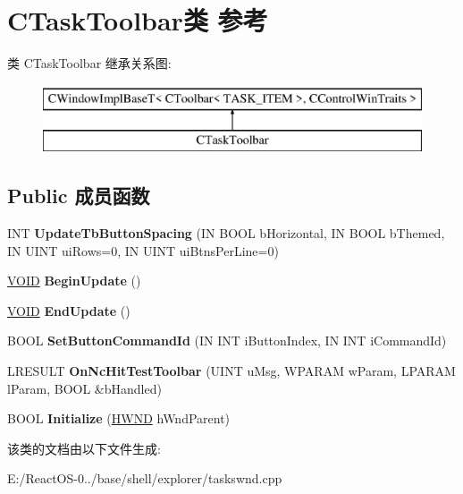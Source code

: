\hypertarget{class_c_task_toolbar}{}\section{C\+Task\+Toolbar类 参考}
\label{class_c_task_toolbar}
类 C\+Task\+Toolbar 继承关系图\+:\begin{figure}[H]
\begin{center}
\leavevmode
\includegraphics[height=2.000000cm]{class_c_task_toolbar}
\end{center}
\end{figure}
\subsection*{Public 成员函数}
\begin{DoxyCompactItemize}
\item 
\mbox{\label{class_c_task_toolbar_a18c8179536de59b3358c7367eda79a08}} 
I\+NT {\bfseries Update\+Tb\+Button\+Spacing} (IN B\+O\+OL b\+Horizontal, IN B\+O\+OL b\+Themed, IN U\+I\+NT ui\+Rows=0, IN U\+I\+NT ui\+Btns\+Per\+Line=0)
\item 
\mbox{\label{class_c_task_toolbar_a9979a3deffb387d4a3fe3b83cbeacab9}} 
\hyperlink{interfacevoid}{V\+O\+ID} {\bfseries Begin\+Update} ()
\item 
\mbox{\label{class_c_task_toolbar_ae73ab089454088364fd6e7be35f7a4ef}} 
\hyperlink{interfacevoid}{V\+O\+ID} {\bfseries End\+Update} ()
\item 
\mbox{\label{class_c_task_toolbar_a03ef6548b3676da2bea323f5f4ecd653}} 
B\+O\+OL {\bfseries Set\+Button\+Command\+Id} (IN I\+NT i\+Button\+Index, IN I\+NT i\+Command\+Id)
\item 
\mbox{\label{class_c_task_toolbar_ae556d9b57d3aec680d67aa32e8098a11}} 
L\+R\+E\+S\+U\+LT {\bfseries On\+Nc\+Hit\+Test\+Toolbar} (U\+I\+NT u\+Msg, W\+P\+A\+R\+AM w\+Param, L\+P\+A\+R\+AM l\+Param, B\+O\+OL \&b\+Handled)
\item 
\mbox{\label{class_c_task_toolbar_af25970a7ef4ae5f76269741da3f20cec}} 
B\+O\+OL {\bfseries Initialize} (\hyperlink{interfacevoid}{H\+W\+ND} h\+Wnd\+Parent)
\end{DoxyCompactItemize}


该类的文档由以下文件生成\+:\begin{DoxyCompactItemize}
\item 
E\+:/\+React\+O\+S-\/0../base/shell/explorer/taskswnd.\+cpp\end{DoxyCompactItemize}
